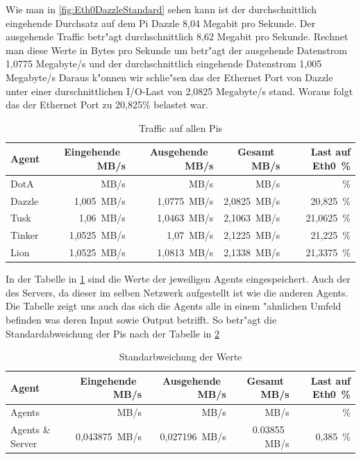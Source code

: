 Wie man in \cref{fig:Eth0DazzleStandard} sehen kann ist der durchschnittlich eingehende Durchsatz auf dem Pi Dazzle 8,04 Megabit %
pro Sekunde. Der ausgehende Traffic betr"agt durchschnittlich 8,62 Megabit pro Sekunde. Rechnet man diese Werte in Bytes pro Sekunde um %
betr"agt der ausgehende Datenstrom 1,0775 Megabyte/s und der durchschnittlich eingehende Datenstrom 1,005 Megabyte/s %
Daraus k"onnen wir schlie"sen das der Ethernet Port von Dazzle unter einer durschnittlichen I/O-Last von 2,0825 Megabyte/s stand. %
Woraus folgt das der Ethernet Port zu 20,825\% belastet war.
\begin{table}
\label{tab:standardTraffic}
\centering
\begin{tabular}{l%
 r<{\,MB/s}%
 r<{\,MB/s}%
 r<{\,MB/s}%
 r<{\,\%}%
}
Agent  	& Eingehende		& Ausgehende		& Gesamt		& Last auf Eth0	\\
\hline
DotA	&			&			&			&			\\
Dazzle 	& 1,005 		& 1,0775		& 2,0825		& 20,825		\\
Tusk 	& 1,06			& 1,0463		& 2,1063		& 21,0625		\\
Tinker	& 1,0525		& 1,07			& 2,1225		& 21,225		\\
Lion	& 1,0525		& 1,0813		& 2,1338		& 21,3375		\\
\end{tabular}
\caption{Traffic auf allen Pis}
\end{table}

In der Tabelle in \cref{tab:standardTraffic} sind die Werte der jeweiligen Agents eingespeichert. Auch der %
des Servers, da dieser im selben Netzwerk aufgestellt ist wie die anderen Agents. Die Tabelle zeigt uns auch %
das sich die Agents alle in einem "ahnlichen Umfeld befinden was deren Input sowie Output betrifft. So betr"agt die
Standardabweichung der Pis nach der Tabelle in \cref{tab:standardTrafficAbweichung}     

\begin{table}
\label{tab:standardTrafficAbweichung}
\centering
\begin{tabular}{l%
 r<{\,MB/s}%
 r<{\,MB/s}%
 r<{\,MB/s}%
 r<{\,\%}%
}
Agent		& Eingehende            & Ausgehende            & Gesamt                & Last auf Eth0 \\
\hline
Agents		&                       &                       &                       &                       \\
Agents \& Server& 0,043875              & 0,027196              & 0.03855               & 0,385                \\
\end{tabular}
\caption{Standarbweichung der Werte}
\end{table}


